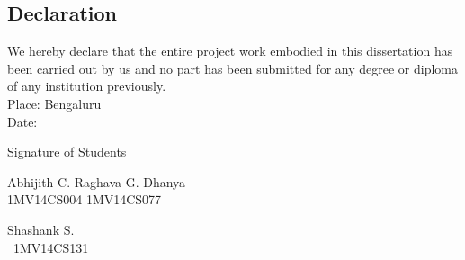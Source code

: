\begin{titlepage}

\chapter*{Declaration}

We hereby declare that the entire project work embodied in this dissertation has been carried out by us and no part has been submitted for any degree or diploma of any institution previously.\bigskip\\

\noindent Place: Bengaluru\\
Date:\\
\begin{center}
Signature of Students
\end{center}
\vspace{100px}

\noindent Abhijith C. \hfill Raghava G. Dhanya \hfill\\
 \noindent 1MV14CS004 \hfill 1MV14CS077 \hspace{37pt}\ \\

\vspace{100px}
\begin{center}
Shashank S.\\
\ 1MV14CS131

\end{center}

\end{titlepage}

